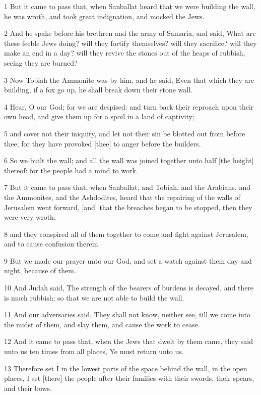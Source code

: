 \par 1 But it came to pass that, when Sanballat heard that we were building the wall, he was wroth, and took great indignation, and mocked the Jews.
\par 2 And he spake before his brethren and the army of Samaria, and said, What are these feeble Jews doing? will they fortify themselves? will they sacrifice? will they make an end in a day? will they revive the stones out of the heaps of rubbish, seeing they are burned?
\par 3 Now Tobiah the Ammonite was by him, and he said, Even that which they are building, if a fox go up, he shall break down their stone wall.
\par 4 Hear, O our God; for we are despised: and turn back their reproach upon their own head, and give them up for a spoil in a land of captivity;
\par 5 and cover not their iniquity, and let not their sin be blotted out from before thee; for they have provoked [thee] to anger before the builders.
\par 6 So we built the wall; and all the wall was joined together unto half [the height] thereof: for the people had a mind to work.
\par 7 But it came to pass that, when Sanballat, and Tobiah, and the Arabians, and the Ammonites, and the Ashdodites, heard that the repairing of the walls of Jerusalem went forward, [and] that the breaches began to be stopped, then they were very wroth;
\par 8 and they conspired all of them together to come and fight against Jerusalem, and to cause confusion therein.
\par 9 But we made our prayer unto our God, and set a watch against them day and night, because of them.
\par 10 And Judah said, The strength of the bearers of burdens is decayed, and there is much rubbish; so that we are not able to build the wall.
\par 11 And our adversaries said, They shall not know, neither see, till we come into the midst of them, and slay them, and cause the work to cease.
\par 12 And it came to pass that, when the Jews that dwelt by them came, they said unto us ten times from all places, Ye must return unto us.
\par 13 Therefore set I in the lowest parts of the space behind the wall, in the open places, I set [there] the people after their families with their swords, their spears, and their bows.

